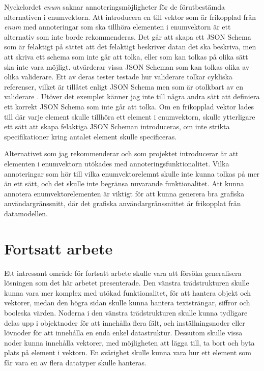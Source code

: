 Nyckelordet \textit{enum} saknar annoteringsmöjligheter för de förutbestämda alternativen i enumvektorn. Att introducera en till vektor som är frikopplad från \textit{enum} med annoteringar som ska tillhöra elementen i enumvektorn är ett alternativ som inte borde rekommenderas. Det går att skapa ett JSON Schema som är felaktigt på sättet att det felaktigt beskriver datan det ska beskriva, men att skriva ett schema som inte går att tolka, eller som kan tolkas på olika sätt ska inte vara möjligt. \citeauthor{Pezoa2016} utvärderar vissa JSON Scheman som kan tolkas olika av olika validerare. Ett av deras tester testade hur validerare tolkar cykliska referenser, vilket är tillåtet enligt JSON Schema men som är otolkbart av en validerare \cite{Pezoa2016}. Utöver det exemplet känner jag inte till några andra sätt att definiera ett korrekt JSON Schema som inte går att tolka. Om en frikopplad vektor lades till där varje element skulle tillhöra ett element i enumvektorn, skulle ytterligare ett sätt att skapa felaktiga JSON Scheman introduceras, om inte strikta specifikationer kring antalet element skulle specificeras.

Alternativet som jag rekommenderar och som projektet introducerar är att elementen i enumvektorn utökades med annoteringsfunktionalitet. Vilka annoteringar som hör till vilka enumvektorelemnt skulle inte kunna tolkas på mer än ett sätt, och det skulle inte begränsa nuvarande funktionalitet. Att kunna annotera enumvektorelementen är viktigt för att kunna generera bra grafiska användargränssnitt, där det grafiska användargränssnittet är frikopplat från datamodellen.

\section{Fortsatt arbete}
\label{sec:slutsats:fortsatt-arbete}
Ett intressant område för fortsatt arbete skulle vara att försöka generalisera lösningen som det här arbetet presenterade. Den vänstra trädstrukturen skulle kunna vara mer komplex med utökad funktionalitet, för att hantera objekt och vektorer, medan den högra sidan skulle kunna hantera textsträngar, siffror och booleska värden. Noderna i den vänstra trädstrukturen skulle kunna tydligare delas upp i objektnoder för att innehålla flera fält, och inställningsnoder eller lövnoder för att innehålla en enda enkel datastruktur. Dessutom skulle vissa noder kunna innehålla vektorer, med möjligheten att lägga till, ta bort och byta plats på element i vektorn. En svårighet skulle kunna vara hur ett element som får vara en av flera datatyper skulle hanteras.

